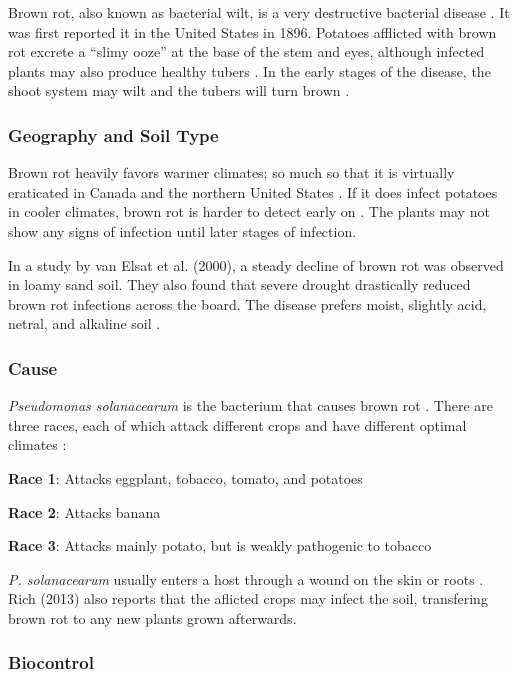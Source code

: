 \documentclass[12pt]{article}
\begin{document}
Brown rot, also known as bacterial wilt, is a very destructive bacterial disease \autocite{rich2013potato}. It was first reported it in the United States in 1896. Potatoes afflicted with brown rot excrete a ``slimy ooze'' at the base of the stem and eyes, although infected plants may also produce healthy tubers \autocite{rich2013potato}. In the early stages of the disease, the shoot system may wilt and the tubers will turn brown \autocite{kabeil2008potato}.

\subsubsection{Geography and Soil Type}

Brown rot heavily favors warmer climates; so much so that it is virtually eraticated in Canada and the northern United States \autocite{rich2013potato}. If it does infect potatoes in cooler climates, brown rot is harder to detect early on \autocite{kabeil2008potato}. The plants may not show any signs of infection until later stages of infection.

In a study by van Elsat et al. (2000), a steady decline of brown rot was observed in loamy sand soil. They also found that severe drought drastically reduced brown rot infections across the board. The disease prefers moist, slightly acid, netral, and alkaline soil \autocite{rich2013potato}.

\subsubsection{Cause}

\emph{Pseudomonas solanacearum} is the bacterium that causes brown rot \autocite{van2000survival}. There are three races, each of which attack different crops and have different optimal climates \autocite{rich2013potato}:

\textbf{Race 1}: Attacks eggplant, tobacco, tomato, and potatoes

\textbf{Race 2}: Attacks banana

\textbf{Race 3}: Attacks mainly potato, but is weakly pathogenic to tobacco

\emph{P. solanacearum} usually enters a host through a wound on the skin or roots \autocite{rich2013potato}. Rich (2013) also reports that the aflicted crops may infect the soil, transfering brown rot to any new plants grown afterwards.

\subsubsection{Biocontrol}
\end{document}
